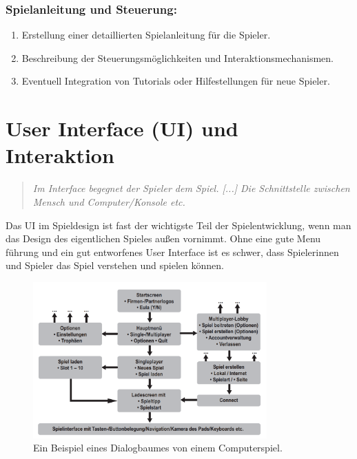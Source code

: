 \subsection{Spielanleitung und Steuerung:}
\begin{enumerate}
  \item Erstellung einer detaillierten Spielanleitung für die Spieler.
  \item Beschreibung der Steuerungsmöglichkeiten und Interaktionsmechanismen.
  \item Eventuell Integration von Tutorials oder Hilfestellungen für neue Spieler.
\end{enumerate}


\chapter{User Interface (UI) und Interaktion}

\begin{quote}
\emph{\glqq Im Interface begegnet der Spieler dem Spiel. [...] Die Schnittstelle zwischen Mensch und Computer/Konsole etc.\grqq}~\cite[p.~161]{GameDesign} \\
\end{quote}

Das UI im Spieldesign ist fast der wichtigste Teil der Spielentwicklung, wenn man das Design des eigentlichen Spieles außen vornimmt. 
Ohne eine gute Menu führung und ein gut entworfenes User Interface ist es schwer, dass Spielerinnen und Spieler das Spiel verstehen und spielen können. 

\begin{figure}[H]
  \centering
  \includegraphics[width=0.8\textwidth]{chapters/03/images/Spielinterface.png}
  \caption{Ein Beispiel eines Dialogbaumes von einem Computerspiel.}
  \label{htl01}
\end{figure}

